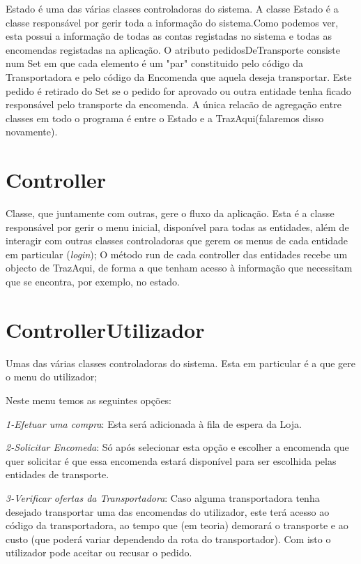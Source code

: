 \documentclass[a4paper]{report}
\begin{document}
	Estado é uma das várias classes controladoras do sistema.
	A classe Estado é a classe responsável por gerir toda a informação do sistema.Como podemos ver, esta possui a informação de todas as contas registadas no sistema e todas as encomendas registadas na aplicação. O atributo pedidosDeTransporte consiste num Set em que cada elemento é um "par" constituido pelo código da Transportadora e pelo código da Encomenda que aquela deseja transportar. Este pedido é retirado do Set se o pedido for aprovado ou outra entidade tenha ficado responsável pelo transporte da encomenda. A única relacão de agregação entre classes em todo o programa é entre o Estado e a TrazAqui(falaremos disso novamente).
	
	\section{Controller}
	Classe, que juntamente com outras, gere o fluxo da aplicação. Esta é a classe responsável por gerir o menu inicial, disponível para todas as entidades, além de interagir com outras classes controladoras que gerem os menus de cada entidade em particular (\textit{login});
	O método run de cada controller das entidades recebe um objecto de TrazAqui, de forma a que tenham acesso à informação que necessitam que se encontra, por exemplo, no estado.


    \section{ControllerUtilizador}
    Umas das várias classes controladoras do sistema. Esta em particular é a que gere o menu do utilizador; 
    
      Neste menu temos as seguintes opções:
      
      \textit{1-Efetuar uma compra}: Esta será adicionada à fila de espera da Loja.
      
      \textit{2-Solicitar Encomeda}: Só após selecionar esta opção e escolher a encomenda que quer solicitar é que essa encomenda estará disponível para ser escolhida pelas entidades de transporte.
      
      \textit{3-Verificar ofertas da Transportadora}: Caso alguma transportadora tenha desejado transportar uma das encomendas do  utilizador, este terá acesso ao código da transportadora, ao tempo que (em teoria) demorará o transporte e ao custo (que poderá variar dependendo da rota do transportador). Com isto o utilizador pode aceitar ou recusar o pedido.
      
\end{document}
